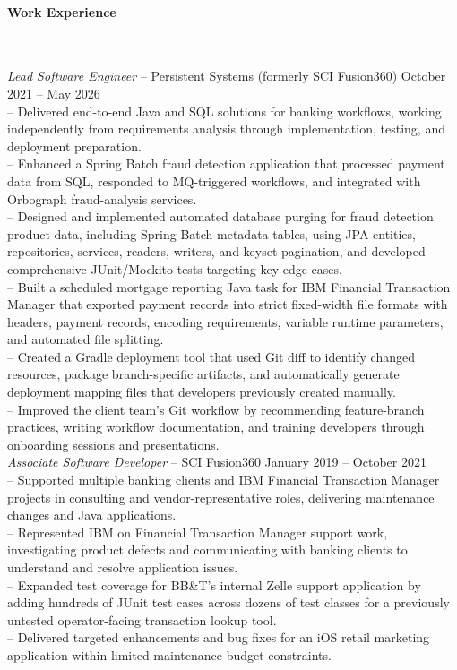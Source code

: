 \documentclass{article}
\begin{document}
	\paragraph{Work Experience} $ $

    \setlength{\parindent}{0.0in}
	\hangindent=0.2in
	\textit{Lead Software Engineer} -- Persistent Systems (formerly SCI Fusion360) \hfill October 2021 -- May 2026 \\
    -- Delivered end-to-end Java and SQL solutions for banking workflows, working independently from requirements analysis through implementation, testing, and deployment preparation. \\
    -- Enhanced a Spring Batch fraud detection application that processed payment data from SQL, responded to MQ-triggered workflows, and integrated with Orbograph fraud-analysis services. \\
    -- Designed and implemented automated database purging for fraud detection product data, including Spring Batch metadata tables, using JPA entities, repositories, services, readers, writers, and keyset pagination, and developed comprehensive JUnit/Mockito tests targeting key edge cases. \\
    -- Built a scheduled mortgage reporting Java task for IBM Financial Transaction Manager that exported payment records into strict fixed-width file formats with headers, payment records, encoding requirements, variable runtime parameters, and automated file splitting. \\
    -- Created a Gradle deployment tool that used Git diff to identify changed resources, package branch-specific artifacts, and automatically generate deployment mapping files that developers previously created manually. \\
    -- Improved the client team’s Git workflow by recommending feature-branch practices, writing workflow documentation, and training developers through onboarding sessions and presentations. \\

    \hangindent=0.2in
	\textit{Associate Software Developer} -- SCI Fusion360 \hfill January 2019 -- October 2021 \\
    -- Supported multiple banking clients and IBM Financial Transaction Manager projects in consulting and vendor-representative roles, delivering maintenance changes and Java applications. \\
    -- Represented IBM on Financial Transaction Manager support work, investigating product defects and communicating with banking clients to understand and resolve application issues. \\
    -- Expanded test coverage for BB\&T’s internal Zelle support application by adding hundreds of JUnit test cases across dozens of test classes for a previously untested operator-facing transaction lookup tool. \\
    -- Delivered targeted enhancements and bug fixes for an iOS retail marketing application within limited maintenance-budget constraints. \\
\end{document}
